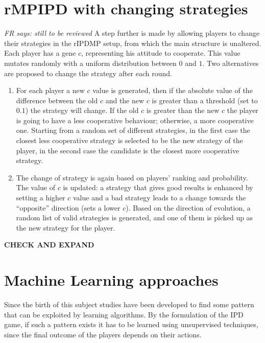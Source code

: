 \documentclass[journal,a4paper,10pt,twoside]{IEEEtran} %
\newcommand{\FR}[1]{\textit{\color{ForestGreen}FR says: #1}}
\begin{document}
\section{rMPIPD with changing strategies} \label{s:crIPDMP}
\FR{still to be reviewed}
A step further is made by allowing players to change their strategies in the rIPDMP setup, from which the main structure is unaltered.
Each player has a gene $c$, representing his attitude to cooperate. This value mutates randomly with a uniform distribution between $0$ and $1$.
Two alternatives are proposed to change the strategy after each round.
\begin{enumerate}
    \item For each player a new $c$ value is generated, then if the absolute value of the difference between the old $c$ and the new $c$ is greater than a threshold (set to $0.1$) the strategy will change. If the old $c$ is greater than the new $c$ the player is going to have a less cooperative behaviour; otherwise, a more cooperative one. 
    Starting from a random set of different strategies, in the first case the closest less cooperative strategy is selected to be the new strategy of the player, in the second case the candidate is the closest more cooperative strategy.

	\item The change of strategy is again based on players' ranking and probability. The value of $c$ is updated: a strategy that gives good results is enhanced by setting a higher $c$ value and a bad strategy leads to a change towards the ``opposite'' direction (sets a lower $c$).
	Based on the direction of evolution, a random list of valid strategies is generated, and one of them is picked up as the new strategy for the player.
\end{enumerate}
\textbf{CHECK AND EXPAND}

\section{Machine Learning approaches} \label{s:ml}
Since the birth of this subject studies have been developed to find some pattern that can be exploited by learning algorithms.
By the formulation of the IPD game, if such a pattern exists it has to be learned using unsupervised techniques, since the final outcome of the players depends on their actions.
\end{document}
